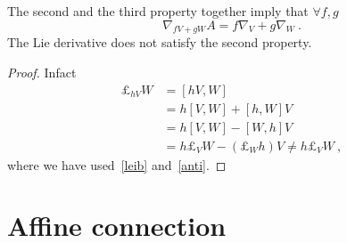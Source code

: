     The second and the third property together imply that $\forall f, g$
    \begin{equation*}
        \nabla_{fV+gW} A = f \nabla_V + g \nabla_W ~.
    \end{equation*}
    The Lie derivative does not satisfy the second property. 
    \begin{proof}
        Infact
        \begin{equation*}
        \begin{aligned}
            \pounds_{hV} W & = [hV, W] \\ & = h [V, W] + [h, W] V \\ &= h [V, W] - [W, h] V \\ & = h \pounds_V W - (\pounds_W h) V \neq h \pounds_V W ~,
        \end{aligned}
        \end{equation*}
        where we have used~\eqref{leib} and~\eqref{anti}.
    \end{proof}

\section{Affine connection}

